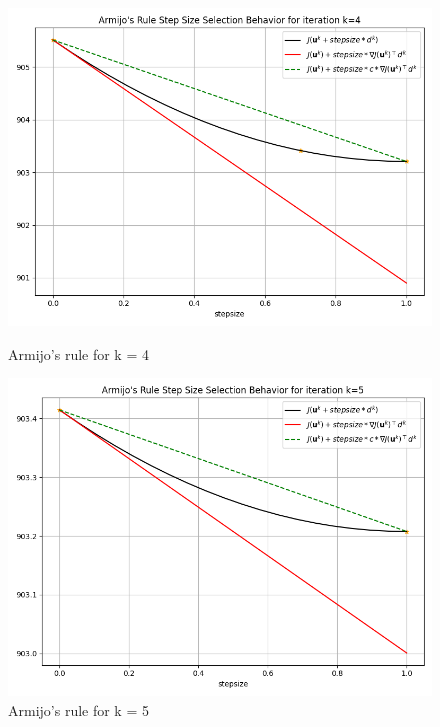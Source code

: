 \documentclass[a4paper,11pt,oneside]{book}
\begin{document}
\begin{itemize}
\begin{figure}[ht]
\begin{minipage}[t]{0.48\textwidth}
        \includegraphics[width=\textwidth]{Armijo's_Rule_K=3_T1.png}
        \caption{Armijo's rule for k = 4}
        \label{fig:sinistra}
    \end{minipage}
    \hfill
    \begin{minipage}[t]{0.48\textwidth}
        \centering
        \includegraphics[width=\textwidth]{Armijo's_Rule_K =4_T1.png}
        \caption{Armijo's rule for k = 5}
        \label{fig:destra}
    \end{minipage}
\end{figure}
\begin{figure}[ht]
    \begin{minipage}[t]{0.48\textwidth}

\end{minipage}
\end{figure}
\end{itemize}
\end{document}
